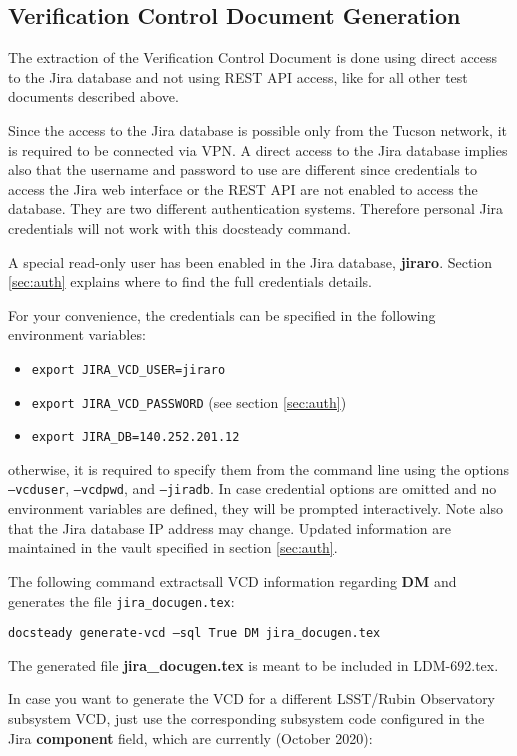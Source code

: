 \documentclass[DM]{lsstdoc}
\begin{document}
\subsection{Verification Control Document Generation}

The extraction of the Verification Control Document is done using direct access to the Jira database and not using REST API access, like for all other test documents described above.

Since the access to the Jira database is possible only from the Tucson network, it is required to be connected via VPN.
A direct access to the Jira database implies also that the username and password to use are different since credentials to access the Jira web interface or the REST API are not enabled to access the database. They are two different authentication systems.
Therefore personal Jira credentials will not work with this docsteady command.

A special read-only user has been enabled in the Jira database, \textbf{jiraro}.
Section \ref{sec:auth} explains where to find the full credentials details.

For your convenience, the credentials can be specified in the following environment variables:

\begin{itemize}
\item \texttt{export JIRA\_VCD\_USER=jiraro}
\item \texttt{export JIRA\_VCD\_PASSWORD} (see section \ref{sec:auth})
\item \texttt{export JIRA\_DB=140.252.201.12}
\end{itemize}

otherwise, it is required to specify them from the command line using the options \texttt{--vcduser}, \texttt{--vcdpwd}, and \texttt{--jiradb}.
In case credential options are omitted and no environment variables are defined, they will be prompted interactively.
Note also that the Jira database IP address may change. Updated information are maintained in the vault specified in section \ref{sec:auth}.

The following command extractsall VCD information regarding \textbf{DM} and generates the file \texttt{jira\_docugen.tex}:

\texttt{docsteady generate-vcd --sql True DM jira\_docugen.tex}

The generated file \textbf{jira\_docugen.tex} is meant to be included in LDM-692.tex.

In case you want to generate the VCD for a different LSST/Rubin Observatory subsystem VCD,
just use the corresponding subsystem code configured in the Jira \textbf{component} field, which are currently (October 2020):
\end{document}
